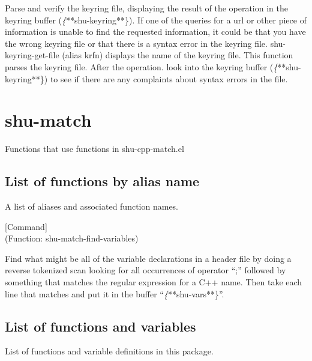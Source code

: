 \begin{doc-string}
Parse and verify the keyring file, displaying the result of the operation in the
keyring buffer (\emph\{**shu-keyring**\}).  If one of the queries for a url or other
piece of information is unable to find the requested information, it could be
that you have the wrong keyring file or that there is a syntax error in the
keyring file.  shu-keyring-get-file (alias krfn) displays the name of the
keyring file.  This function parses the keyring file.  After the operation. look
into the keyring buffer (\emph\{**shu-keyring**\}) to see if there are any complaints
about syntax errors in the file.
\end{doc-string}

\eject
\section{shu-match}


Functions that use functions in shu-cpp-match.el


\subsection{List of functions by alias name}

A list of aliases and associated function names.



\vspace{1em}
\noindent
{}
\usebox{\funcname}
 \hfill [Command]\\%
 (Function: shu-match-find-variables)

\begin{doc-string}
Find what might be all of the variable declarations in a header file by doing
a reverse tokenized scan looking for all occurrences of operator ``;'' followed
by something that matches the regular expression for a C++ name.  Then take each
line that matches and put it in the buffer ``\emph\{**shu-vars**\}''.
\end{doc-string}

\subsection{List of functions and variables}

List of functions and variable definitions in this package.



